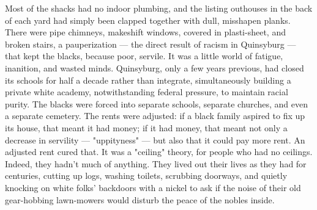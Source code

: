   Most of the shacks had no indoor plumbing, and the listing outhouses in the
back of each yard had simply been clapped together with dull, misshapen planks.
There were pipe chimneys, makeshift windows, covered in plasti-sheet, and broken
stairs, a pauperization --- the direct result of racism in Quinsyburg --- 
that kept the blacks, because poor, servile. 
It was a little world of fatigue, inanition, 
and wasted minds. Quinsyburg, only a few years previous, had closed its schools 
for half a decade rather than integrate, simultaneously building a private white
academy, notwithstanding federal pressure, to maintain racial purity. The blacks
were forced into separate schools, separate churches, and even a separate
cemetery. The rents were adjusted: if a black family aspired to fix up its
house, that meant it had money; if it had money, that meant not only a decrease
in servility --- "uppityness" --- but also that it could pay more rent. An 
adjusted rent cured that. It was a "ceiling" theory, for people 
who had no ceilings. Indeed, they hadn't much of anything. 
They lived out their lives as they had for
centuries, cutting up logs, washing toilets, scrubbing doorways, and quietly
knocking on white folks' backdoors with a nickel to ask if the noise of their
old gear-hobbing 
lawn-mowers would disturb the peace of the nobles inside.

